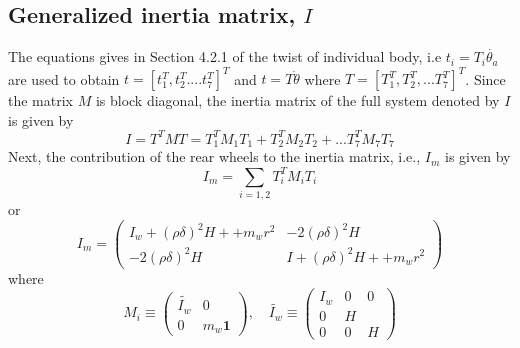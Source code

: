 \subsection{Generalized inertia matrix, $I$}
\label{sec:GIM}
 The equations gives in Section 4.2.1 of the twist of individual body, i.e $t_i=T_i\dot{\theta_a}$ are used to obtain   $t=[t_1^T, t_2^T....t_7^T]^T$ and $t=T\dot\theta$ where  $T=[T_1^T, T_2^T,... T_7^T]^T$. Since the matrix $M$ is block diagonal, the inertia matrix of the full system  denoted by $I$ is given by
\begin{equation}
I=T^TMT=T_1^TM_1T_1+T_2^TM_2T_2+...T_7^TM_7T_7
\end{equation}
Next, the contribution of the rear wheels  to the inertia matrix, i.e., $I_m$ is given by  \[ I_m=\sum_{i=1,2}T_i^TM_iT_i\] or
\begin{equation}
\label{eqn:I_wheel}
I_m=\begin{pmatrix}
I_w+(\rho\delta)^2H++m_wr^2 & -2(\rho\delta)^2H
\\
-2(\rho\delta)^2H &I+(\rho\delta)^2H++m_wr^2
\end{pmatrix} 
\end{equation}
where 
\begin{equation}
\label{eqn:wheelInertiaMatrix}
M_i \equiv\begin{pmatrix}
\tilde{I_w} &0\\0 & m_w\mathbf{1}
\end{pmatrix} , \quad\tilde{I_w}\equiv\begin{pmatrix}
I_w&0&0\\0&H&\\0&0&H
\end{pmatrix}
\end{equation} 

